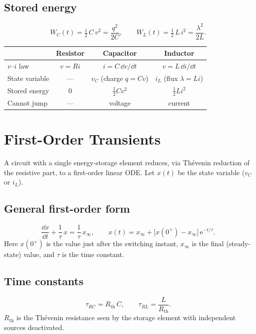 \documentclass{essay}
\newcommand{\ee}{\mathrm{e}}
\begin{document}
\subsection{Stored energy}
\[
  W_C(t) = \tfrac{1}{2}\,C\,v^2 = \frac{q^2}{2C}, \qquad
  W_L(t) = \tfrac{1}{2}\,L\,i^2 = \frac{\lambda^2}{2L}.
\]

\begin{center}
  \begin{tabular}{@{}lccc@{}}
    \hline
    & \textbf{Resistor} & \textbf{Capacitor} & \textbf{Inductor}\\
    \hline
    $v$--$i$ law      & $v=Ri$                 & $i=C\,\dd v/\dd t$
    & $v=L\,\dd i/\dd t$\\
    State variable    & ---                    & $v_C$ (charge
    $q=Cv$)    & $i_L$ (flux $\lambda=Li$)\\
    Stored energy     & $0$                    & $\tfrac12 C v^2$
    & $\tfrac12 L i^2$\\
    Cannot jump       & ---                    & voltage
    & current\\
    \hline
  \end{tabular}
\end{center}

\section{First-Order Transients}

A circuit with a single energy-storage element reduces, via Th\'evenin
reduction of the resistive part, to a first-order linear ODE. Let $x(t)$ be the
state variable ($v_C$ or $i_L$).

\subsection{General first-order form}
\[
  \frac{\dd x}{\dd t} + \frac{1}{\tau}\,x = \frac{1}{\tau}\,x_\infty,
  \qquad
  x(t) = x_\infty + \bigl[x(0^+) - x_\infty\bigr]\,\ee^{-t/\tau}.
\]
Here $x(0^+)$ is the value just after the switching instant, $x_\infty$ is the
final (steady-state) value, and $\tau$ is the time constant.

\subsection{Time constants}
\[
  \tau_{RC} = R_{\mathrm{th}}\,C, \qquad \tau_{RL} = \frac{L}{R_{\mathrm{th}}} .
\]
$R_{\mathrm{th}}$ is the Th\'evenin resistance seen by the storage element with
independent sources deactivated.
\end{document}
